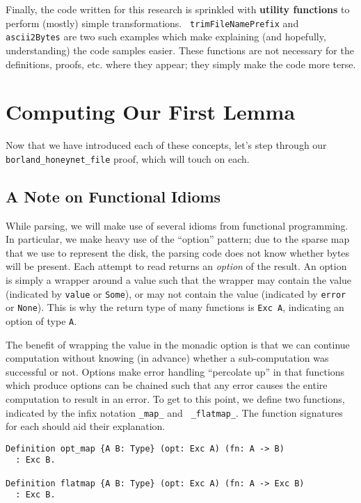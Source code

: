 \documentclass[nocopyrightspace]{sigplanconf}
\begin{document}
Finally, the code written for this research is sprinkled with {\bf utility
functions} to perform (mostly) simple transformations. {\tt
trimFileNamePrefix} and {\tt ascii2Bytes} are two such examples which make
explaining (and hopefully, understanding) the code samples easier. These
functions are not necessary for the definitions, proofs, etc. where they
appear; they simply make the code more terse.

\section{Computing Our First Lemma}

Now that we have introduced each of these concepts, let's step through our
{\tt borland\_honeynet\_file} proof, which will touch on each.

\subsection{A Note on Functional Idioms}

While parsing, we will make use of several idioms from functional programming.
In particular, we make heavy use of the ``option'' pattern; due to the sparse
map that we use to represent the disk, the parsing code does not know whether
bytes will be present. Each attempt to read returns an {\em option} of the
result. An option is simply a wrapper around a value such that the wrapper may
contain the value (indicated by {\tt value} or {\tt Some}), or may not contain
the value (indicated by {\tt error} or {\tt None}).  This is why the return
type of many functions is {\tt Exc A}, indicating an option of type {\tt A}. 

The benefit of wrapping the value in the monadic option is that we can
continue computation without knowing (in advance) whether a sub-computation
was successful or not. Options make error handling ``percolate up'' in that
functions which produce options can be chained such that any error causes the
entire computation to result in an error. To get to this point, we define two
functions, indicated by the infix notation {\tt \_map\_} and {\tt
\_flatmap\_}. The function signatures for each should aid their explanation.

\begin{lstlisting}
Definition opt_map {A B: Type} (opt: Exc A) (fn: A -> B)
  : Exc B.

Definition flatmap {A B: Type} (opt: Exc A) (fn: A -> Exc B)
  : Exc B.
\end{lstlisting}
\end{document}
